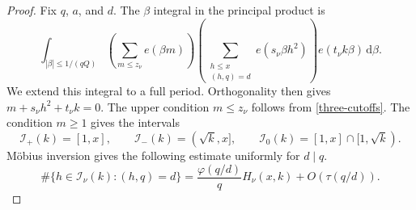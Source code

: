 \documentclass[10pt,a4paper]{amsart}
\newcommand{\dif}{\mathrm{d}}
\begin{document}
\begin{proof}
Fix $q$, $a$, and $d$.  The $\beta$ integral in the principal product
is
\[
 \int_{|\beta|\leq1/(qQ)}
 \left(\sum_{m\leq z_\nu}e(\beta m)\right)
 \left(\sum_{\substack{h\leq x\\(h,q)=d}}e(s_\nu\beta h^2)\right)
 e(t_\nu k\beta)\,\dif\beta.
\]
We extend this integral to a full period.  Orthogonality then gives
$m+s_\nu h^2+t_\nu k=0$.  The upper condition $m\leq z_\nu$ follows
from \eqref{three-cutoffs}.  The condition $m\geq1$ gives the intervals
\[
 \mathcal I_+(k)=[1,x],\qquad
 \mathcal I_-(k)=(\sqrt k,x],\qquad
 \mathcal I_0(k)=[1,x]\cap[1,\sqrt{k}).
\]
M\"obius inversion gives the following estimate uniformly for
$d\mid q$.
\begin{equation}\label{unified-coprime-count}
 \#\{h\in\mathcal I_\nu(k):(h,q)=d\}
 =\frac{\varphi(q/d)}qH_\nu(x,k)+O(\tau(q/d)).
\end{equation}


\end{proof}
\end{document}

